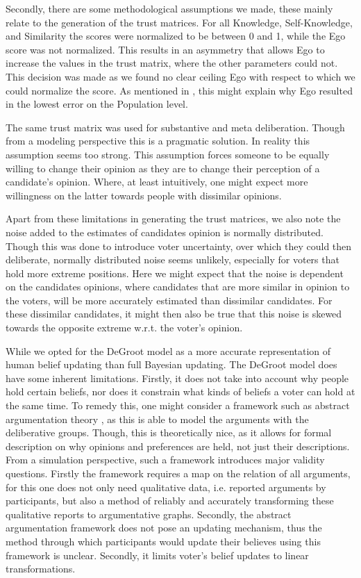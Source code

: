 Secondly, there are some methodological assumptions we made, these mainly
relate to the generation of the trust matrices. For all Knowledge,
Self-Knowledge, and Similarity the scores were normalized to be between 0 and
1, while the Ego score was not normalized. This results in an asymmetry that
allows Ego to increase the values in the trust matrix, where the other
parameters could not. This decision was made as we found no clear ceiling Ego
with respect to which we could normalize the score. As mentioned in ,
this might explain why Ego resulted in the lowest error on the Population level.

The same trust matrix was used for substantive and meta deliberation. Though
from a modeling perspective this is a pragmatic solution. In reality this
assumption seems too strong. This assumption forces someone to be equally
willing to change their opinion as they are to change their perception of a
candidate's opinion. Where, at least intuitively, one might expect more
willingness on the latter towards people with dissimilar opinions.


Apart from these limitations in generating the trust matrices, we also note the
noise added to the estimates of candidates opinion is normally distributed.
Though this was done to introduce voter uncertainty, over which they could then
deliberate, normally distributed noise seems unlikely, especially for voters
that hold more extreme positions. Here we might expect that the noise is
dependent on the candidates opinions, where candidates that are more similar in
opinion to the voters, will be more accurately estimated than dissimilar
candidates. For these dissimilar candidates, it might then also be true that
this noise is skewed towards the opposite extreme w.r.t. the voter's opinion.

While we opted for the DeGroot model as a more accurate representation of human
belief updating than full Bayesian updating. The DeGroot model does have some
inherent limitations. Firstly, it does not take into account why people hold
certain beliefs, nor does it constrain what kinds of beliefs a voter can hold
at the same time. To remedy this, one might consider a framework such as
abstract argumentation theory \citet{dungAcceptabilityArgumentsIts1995}, as
this is able to model the arguments with the deliberative groups. Though, this
is theoretically nice, as it allows for formal description on why opinions and
preferences are held, not just their descriptions. From a simulation
perspective, such a framework introduces major validity questions. Firstly the
framework requires a map on the relation of all arguments, for this one does
not only need qualitative data, i.e. reported arguments by participants, but
also a method of reliably and accurately transforming these qualitative reports
to argumentative graphs. Secondly, the abstract argumentation framework does
not pose an updating mechanism, thus the method through which participants
would update their believes using this framework is unclear. Secondly, it limits
voter's belief updates to linear transformations. 



